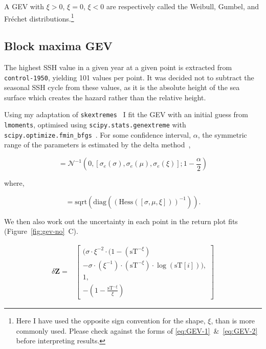     A GEV with $\xi>0$, $\xi=0$, $\xi<0$ are
    respectively called the Weibull, Gumbel, and Fr\'echet
    distributions.\footnote{Here I have used the opposite sign convention for
    the shape, $\xi$, than is more commonly used. Please check against the
    forms of \ref{eq:GEV-1}~\&~\ref{eq:GEV-2} before interpreting results. }

\subsection{Block maxima GEV}
The highest SSH value in a given year at a given point
is extracted from \texttt{control-1950}, yielding 101 values per point.
It was decided not to subtract the seasonal SSH cycle from these
values, as it is the absolute height of the sea surface which
creates the hazard rather than the relative height.








Using my adaptation of \texttt{skextremes}~\cite{skextremes} I fit the
GEV with an initial guess from \texttt{lmoments}, optimised using
\texttt{scipy.stats.genextreme} with \texttt{scipy.optimize.fmin\_bfgs}~\cite{2020SciPy-NMeth}.
For some confidence interval, $\alpha$, the symmetric range of the parameters is
estimated by the delta method~\cite{coles2001introduction},

\begin{equation}
[\Delta \sigma , \Delta \mu, \Delta \xi] =
\mathcal{N}^{-1}(0, [\sigma_e (\sigma), \sigma_e (\mu), \sigma_e (\xi)]; 1-\frac{\alpha}{2})
\end{equation}

where,

\begin{equation}
[\sigma_e (\sigma), \sigma_e (\mu), \sigma_e (\xi)] =
\mathrm{sqrt}\left(\mathrm{diag}\left(\left( \mathrm{Hess}([\sigma, \mu, \xi]) \right)^{-1} \right)\right).
\end{equation}

We then also work out the uncertainty in each point in the
return plot fits (Figure~\ref{fig:gev-no}~C).

\begin{align}
\delta \mathbf{Z} = & \left[ \begin{array}{l}(\sigma\cdot\xi^{-2} \cdot (1-(\mathrm{sT}^{-\xi})
            \\-\sigma \cdot (\xi^{-1})\cdot (\mathrm{sT}^{-\xi}) \cdot \log(\mathrm{sT}[i])),\\
            1,\\
            -(1- \frac{\mathrm{sT}^{-\xi}}{\xi})
            \end{array} \right]
\end{align}


